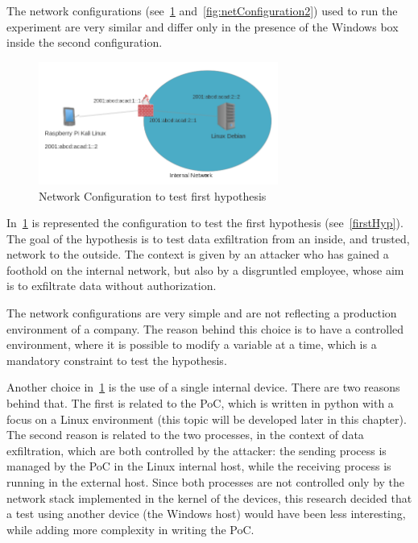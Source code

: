 \documentclass[12pt]{article}
\begin{document}
The network configurations (see~\ref{fig:netConfiguration1} and~\ref{fig:netConfiguration2}) used to run the experiment are very similar and differ only in the presence of the Windows box inside the second configuration.


\begin{figure}[ht] 
\begin{center}
\includegraphics[width=0.7\textwidth]{networkTopology1}
\caption{Network Configuration to test first hypothesis}
\label{fig:netConfiguration1}
\end{center}
\end{figure}

In~\ref{fig:netConfiguration1} is represented the configuration to test the first hypothesis (see~\ref{firstHyp}). The goal of the hypothesis is to test data exfiltration from an inside, and trusted, network to the outside. The context is given by an attacker who has gained a foothold on the internal network, but also by a disgruntled employee, whose aim is to exfiltrate data without authorization.

The network configurations are very simple and are not reflecting a production environment of a company. The reason behind this choice is to have a controlled environment, where it is possible to modify a variable at a time, which is a mandatory constraint to test the hypothesis.

Another choice in~\ref{fig:netConfiguration1} is the use of a single internal device. There are two reasons behind that. The first is related to the PoC, which is written in python with a focus on a Linux environment (this topic will be developed later in this chapter). The second reason is related to the two processes, in the context of data exfiltration, which are both controlled by the attacker: the sending process is managed by the PoC in the Linux internal host, while the receiving process is running in the external host. Since both processes are not controlled only by the network stack implemented in the kernel of the devices, this research decided that a test using another device (the Windows host) would have been less interesting, while adding more complexity in writing the PoC.
\end{document}
